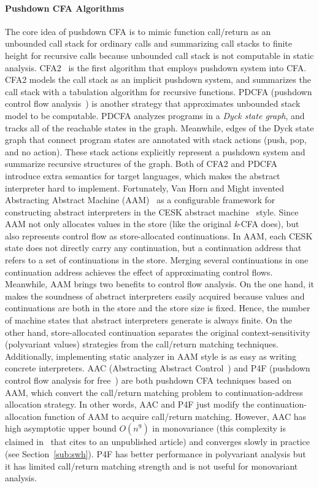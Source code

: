 \documentclass[12pt]{report}
\begin{document}
\paragraph{Pushdown CFA Algorithms}
The core idea of pushdown CFA is to mimic function call/return as an unbounded call stack for ordinary calls and summarizing call stacks to finite height for recursive calls because unbounded call stack is not computable in static analysis.
CFA2~\cite{vardoulakis2010cfa2} is the first algorithm that employs pushdown system into CFA\@.
CFA2 models the call stack as an implicit pushdown system, and summarizes the call stack with a tabulation algorithm for recursive functions.
PDCFA (pushdown control flow analysis~\cite{earl2010pushdown})
is another strategy that approximates unbounded stack model to be computable.
PDCFA analyzes programs in a \emph{Dyck state graph}, and tracks all of the reachable states in the graph.
Meanwhile, edges of the Dyck state graph that connect program states are annotated with stack actions (push, pop, and no action).
These stack actions explicitly represent a pushdown system and summarize recursive structures of the graph.
Both of CFA2 and PDCFA introduce extra semantics for target languages, which makes the abstract interpreter hard to implement.
Fortunately, Van Horn and Might
invented Abstracting Abstract Machine (AAM)~\cite{van2010abstracting}
as a configurable framework for constructing abstract interpreters in the CESK abstract machine~\cite{felleisen1987calculus} style.
Since AAM not only allocates values in the store (like the original \textit{k}-CFA does), but also represents control flow as store-allocated continuations.
In AAM, each CESK state does not directly carry any continuation, but a continuation address that refers to a set of continuations in the store.
Merging several continuations in one continuation address achieves the effect of approximating control flows.
Meanwhile, AAM brings two benefits to control flow analysis.
On the one hand, it makes the soundness of abstract interpreters easily acquired because values and continuations are both in the store and
the store size is fixed.
Hence, the number of machine states that abstract interpreters generate is always finite.
On the other hand, store-allocated continuation separates the original context-sensitivity (polyvariant values) strategies from
the call/return matching techniques.
Additionally, implementing static analyzer in AAM style is as easy as writing concrete interpreters.
AAC (Abstracting Abstract Control~\cite{johnson2015abstracting}) and P4F (pushdown control flow analysis for free~\cite{gilray2016pushdown})
are both pushdown CFA techniques based on AAM\@, which convert the call/return matching problem to continuation-address allocation strategy.
In other words, AAC and P4F just modify the continuation-allocation function of AAM to acquire call/return matching.
However, AAC has high asymptotic upper bound $O(n^9)$ in monovariance (this complexity is claimed in~\cite{gilray2016pushdown} that cites to an unpublished article) and converges slowly in practice (see Section~\ref{sub:swh}).
P4F has better performance in polyvariant analysis but it has limited call/return matching strength
and is not useful for monovariant analysis.
\end{document}
